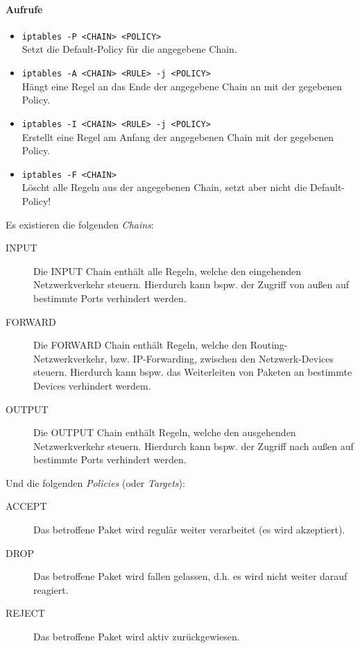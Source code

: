 \documentclass[a4paper, 11pt, accentcolor = tud3b]{tudreport}
\begin{document}
			    \paragraph{Aufrufe}
				    \begin{itemize}
				    	\item \texttt{iptables -P <CHAIN> <POLICY>} \\ Setzt die Default-Policy für die angegebene Chain.
				    	\item \texttt{iptables -A <CHAIN> <RULE> -j <POLICY>} \\ Hängt eine Regel an das Ende der angegebene Chain an mit der gegebenen Policy.
				    	\item \texttt{iptables -I <CHAIN> <RULE> -j <POLICY>} \\ Erstellt eine Regel am Anfang der angegebenen Chain mit der gegebenen Policy.
				    	\item \texttt{iptables -F <CHAIN>} \\ Löscht alle Regeln aus der angegebenen Chain, setzt aber nicht die Default-Policy!
				    \end{itemize}
			    
				    Es existieren die folgenden \textit{Chains}:
				    \begin{description}
				    	\item[INPUT]   Die INPUT Chain enthält alle Regeln, welche den eingehenden Netzwerkverkehr steuern. Hierdurch kann bspw. der Zugriff von außen auf bestimmte Ports verhindert werden.
				    	\item[FORWARD] Die FORWARD Chain enthält Regeln, welche den Routing-Netzwerkverkehr, bzw. IP-Forwarding, zwischen den Netzwerk-Devices steuern. Hierdurch kann bspw. das Weiterleiten von Paketen an bestimmte Devices verhindert werdem.
				    	\item[OUTPUT]  Die OUTPUT Chain enthält Regeln, welche den ausgehenden Netzwerkverkehr steuern. Hierdurch kann bspw. der Zugriff nach außen auf bestimmte Ports verhindert werden.
				    \end{description}
				    
				    Und die folgenden \textit{Policies} (oder \textit{Targets}):
				    \begin{description}
				    	\item[ACCEPT] Das betroffene Paket wird regulär weiter verarbeitet (es wird akzeptiert).
				    	\item[DROP]   Das betroffene Paket wird fallen gelassen, d.h. es wird nicht weiter darauf reagiert.
				    	\item[REJECT] Das betroffene Paket wird aktiv zurückgewiesen.
				    \end{description}
			    
\end{document}
